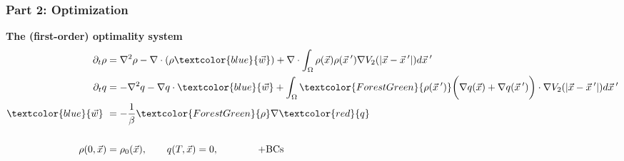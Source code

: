 \documentclass[aspectratio=169,xcolor=dvipsnames]{beamer}
\begin{document}
\begin{frame}
	\frametitle{Part 2: Optimization}
	\textbf{The (first-order) optimality system}\\
     
	\begin{align*}
	 \partial_t \rho &= \nabla^2 \rho - \nabla \cdot (\rho \textcolor{blue}{\vec{w}})
	+ \nabla \cdot \int_\Omega \rho(\vec{x}) \rho(\vec{x}\hspace{0.2em}') \nabla V_2(|\vec{x}-\vec{x}\hspace{0.2em}'|)d\vec{x}\hspace{0.2em}'  \\
	\partial_t q &= -\nabla^2 q - \nabla q \cdot \textcolor{blue}{\vec{w}} + \int_\Omega \textcolor{ForestGreen}{\rho(\vec{x}\hspace{0.2em}')} \bigg(\nabla q(\vec{x}) + \nabla q(\vec{x}\hspace{0.2em}')\bigg)\cdot  \nabla V_2(|\vec{x}-\vec{x}\hspace{0.2em}'|)d\vec{x}\hspace{0.2em}' \\
    \textcolor{blue}{\vec{w}} \ &= - \frac{1}{\beta}\textcolor{ForestGreen}{\rho} \nabla  \textcolor{red}{q}\\
    \\
    \rho(0,\vec{x})&=\rho_0(\vec{x}), \qquad q(T,\vec{x})= 0, \qquad \qquad \text{+BCs}\\
	\end{align*}
\end{frame}
\end{document}
